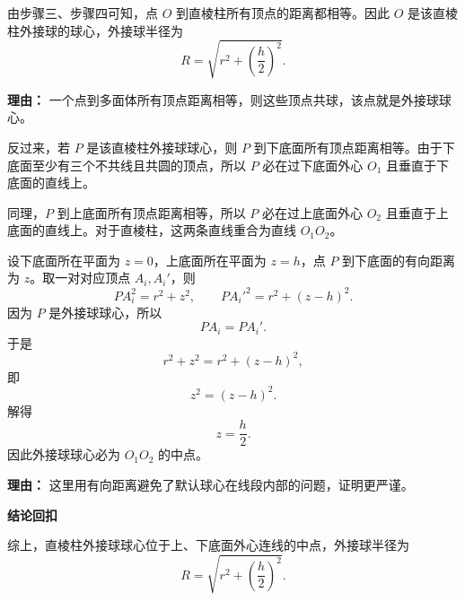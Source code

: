 \begin{proofbox}
\begin{description}[style=nextline, leftmargin=2.8em, labelsep=0.5em, itemsep=0.55em]
		\item[\textbf{步骤五（得出球心和半径）：}]
		      由步骤三、步骤四可知，点 $O$ 到直棱柱所有顶点的距离都相等。因此 $O$ 是该直棱柱外接球的球心，外接球半径为
		      \[
			      R=\sqrt{r^2+\left(\frac{h}{2}\right)^2}.
		      \]
		      \par\textbf{理由：} 一个点到多面体所有顶点距离相等，则这些顶点共球，该点就是外接球球心。

		\item[\textbf{步骤六（必要性说明）：}]
		      反过来，若 $P$ 是该直棱柱外接球球心，则 $P$ 到下底面所有顶点距离相等。由于下底面至少有三个不共线且共圆的顶点，所以 $P$ 必在过下底面外心 $O_1$ 且垂直于下底面的直线上。

		      同理，$P$ 到上底面所有顶点距离相等，所以 $P$ 必在过上底面外心 $O_2$ 且垂直于上底面的直线上。对于直棱柱，这两条直线重合为直线 $O_1O_2$。

		      设下底面所在平面为 $z=0$，上底面所在平面为 $z=h$，点 $P$ 到下底面的有向距离为 $z$。取一对对应顶点 $A_i,A_i'$，则
		      \[
			      PA_i^2=r^2+z^2,\qquad
			      PA_i'^2=r^2+(z-h)^2.
		      \]
		      因为 $P$ 是外接球球心，所以
		      \[
			      PA_i=PA_i'.
		      \]
		      于是
		      \[
			      r^2+z^2=r^2+(z-h)^2,
		      \]
		      即
		      \[
			      z^2=(z-h)^2.
		      \]
		      解得
		      \[
			      z=\frac{h}{2}.
		      \]
		      因此外接球球心必为 $O_1O_2$ 的中点。
		      \par\textbf{理由：} 这里用有向距离避免了默认球心在线段内部的问题，证明更严谨。
	\end{description}

	\medskip
	\textbf{\textcolor{CProof}{结论回扣}}

	综上，直棱柱外接球球心位于上、下底面外心连线的中点，外接球半径为
	\[
		R = \sqrt{r^{2} + \left(\frac{h}{2}\right)^{2}}.
	\]
\end{proofbox}